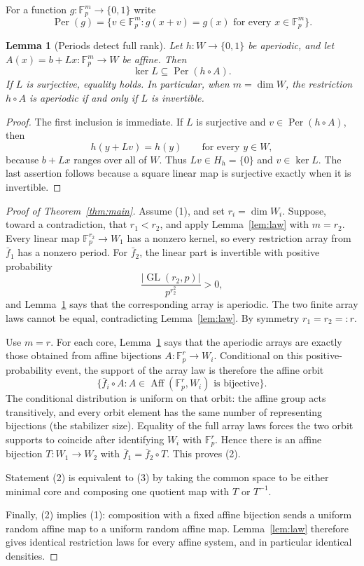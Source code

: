 \documentclass[11pt]{article}
\newtheorem{lemma}{Lemma}
\newcommand{\F}{\mathbb F}
\newcommand{\Per}{\operatorname{Per}}
\newcommand{\Aff}{\operatorname{Aff}}
\begin{document}
For a function $g:\F_p^m\to\{0,1\}$ write
\[
 \Per(g)=\{v\in\F_p^m:g(x+v)=g(x)\text{ for every }x\in\F_p^m\}.
\]

\begin{lemma}[Periods detect full rank]\label{lem:period}
Let $h:W\to\{0,1\}$ be aperiodic, and let
$A(x)=b+Lx:\F_p^m\to W$ be affine.
Then
\[
 \ker L\subseteq\Per(h\circ A).
\]
If $L$ is surjective, equality holds.  In particular, when
$m=\dim W$, the restriction $h\circ A$ is aperiodic if and only if $L$ is
invertible.
\end{lemma}

\begin{proof}
The first inclusion is immediate.  If $L$ is surjective and
$v\in\Per(h\circ A)$, then
\[
 h(y+Lv)=h(y)\qquad\text{for every }y\in W,
\]
because $b+Lx$ ranges over all of $W$.  Thus $Lv\in H_h=\{0\}$ and
$v\in\ker L$.  The last assertion follows because a square linear map is
surjective exactly when it is invertible.
\end{proof}

\begin{proof}[Proof of Theorem~\ref{thm:main}]
Assume (1), and set $r_i=\dim W_i$.  Suppose, toward a contradiction, that
$r_1<r_2$, and apply Lemma~\ref{lem:law} with $m=r_2$.  Every linear map
$\F_p^{r_2}\to W_1$ has a nonzero kernel, so every restriction array from
$\bar f_1$ has a nonzero period.  For $\bar f_2$, the linear part is invertible
with positive probability
\[
 \frac{|\operatorname{GL}(r_2,p)|}{p^{r_2^2}}>0,
\]
and Lemma~\ref{lem:period} says that the corresponding array is aperiodic.
The two finite array laws cannot be equal, contradicting
Lemma~\ref{lem:law}.  By symmetry $r_1=r_2=:r$.

Use $m=r$.  For each core, Lemma~\ref{lem:period} says that the aperiodic
arrays are exactly those obtained from affine bijections
$A:\F_p^r\to W_i$.  Conditional on this positive-probability event, the
support of the array law is therefore the affine orbit
\[
 \{\bar f_i\circ A:A\in\Aff(\F_p^r,W_i)\text{ is bijective}\}.
\]
The conditional distribution is uniform on that orbit: the affine group acts
transitively, and every orbit element has the same number of representing
bijections (the stabilizer size).  Equality of the full array laws forces the
two orbit supports to coincide after identifying $W_i$ with $\F_p^r$.  Hence
there is an affine bijection $T:W_1\to W_2$ with
$\bar f_1=\bar f_2\circ T$.  This proves (2).

Statement (2) is equivalent to (3) by taking the common space to be either
minimal core and composing one quotient map with $T$ or $T^{-1}$.

Finally, (2) implies (1): composition with a fixed affine bijection sends a
uniform random affine map to a uniform random affine map.  Lemma~\ref{lem:law}
therefore gives identical restriction laws for every affine system, and in
particular identical densities.
\end{proof}
\end{document}
